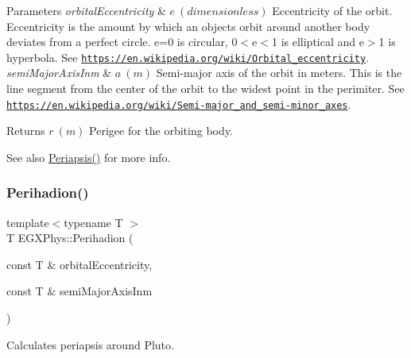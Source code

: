 \begin{DoxyParams}{Parameters}
{\em orbital\+Eccentricity} & $ e\ (dimensionless)$ Eccentricity of the orbit. Eccentricity is the amount by which an objects orbit around another body deviates from a perfect circle. e=0 is circular, 0$<$e$<$1 is elliptical and e$>$1 is hyperbola. See \href{https://en.wikipedia.org/wiki/Orbital_eccentricity}{\tt https\+://en.\+wikipedia.\+org/wiki/\+Orbital\+\_\+eccentricity}. \\
\hline
{\em semi\+Major\+Axis\+Inm} & $ a\ (m)$ Semi-\/major axis of the orbit in meters. This is the line segment from the center of the orbit to the widest point in the perimiter. See \href{https://en.wikipedia.org/wiki/Semi-major_and_semi-minor_axes}{\tt https\+://en.\+wikipedia.\+org/wiki/\+Semi-\/major\+\_\+and\+\_\+semi-\/minor\+\_\+axes}. \\
\hline
\end{DoxyParams}
\begin{DoxyReturn}{Returns}
$ r\ (m)$ Perigee for the orbiting body. 
\end{DoxyReturn}
\begin{DoxySeeAlso}{See also}
\mbox{\hyperlink{group___e_g_x_phys-_periapsis_gad487212733711bc2ce73c8137c9309c3}{Periapsis()}} for more info. 
\end{DoxySeeAlso}
\mbox{\label{group___e_g_x_phys-_periapsis_ga1b844386674d15f7dc768f81b5770b93}} 
\subsubsection{\texorpdfstring{Perihadion()}{Perihadion()}}
{\footnotesize\ttfamily template$<$typename T $>$ \\
T E\+G\+X\+Phys\+::\+Perihadion (\begin{DoxyParamCaption}\item[{const T \&}]{orbital\+Eccentricity,  }\item[{const T \&}]{semi\+Major\+Axis\+Inm }\end{DoxyParamCaption})}



Calculates periapsis around Pluto. 


